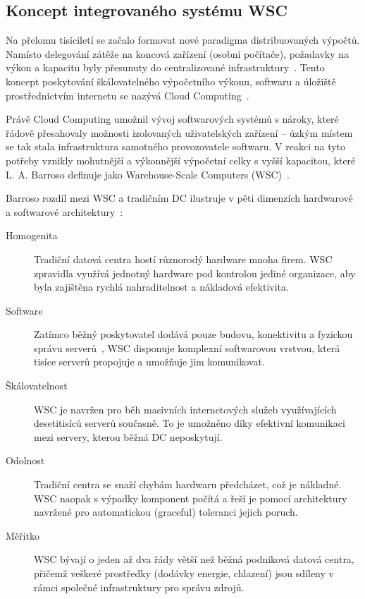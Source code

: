 \subsection{Koncept integrovaného systému WSC}
\label{subsec:wsc}

Na přelomu tisíciletí se začalo formovat nové paradigma distribuovaných výpočtů. Namísto delegování zátěže na koncová zařízení (osobní počítače), požadavky na výkon a kapacitu byly přesunuty do centralizované infrastruktury~\cite{barroso_data_2026}. Tento koncept poskytování škálovatelného výpočetního výkonu, softwaru a úložiště prostřednictvím internetu se nazývá Cloud Computing~\cite{lewis_basics_2010}.

Právě Cloud Computing umožnil vývoj softwarových systémů s nároky, které řádově přesahovaly možnosti izolovaných uživatelských zařízení -- úzkým místem se tak stala infrastruktura samotného provozovatele softwaru. V reakci na tyto potřeby vznikly mohutnější a výkonnější výpočetní celky s vyšší kapacitou, které L. A. Barroso definuje jako Warehouse-Scale Computers (WSC)~\cite{barroso_brief_2021, barroso_data_2026}.

Barroso rozdíl mezi WSC a tradičním DC ilustruje v pěti dimenzích hardwarové a softwarové architektury~\cite[s.~2--4]{barroso_data_2026}:

\begin{description}
    \item[Homogenita] Tradiční datová centra hostí různorodý hardware mnoha firem. WSC zpravidla využívá jednotný hardware pod kontrolou jediné organizace, aby byla zajištěna rychlá nahraditelnost a nákladová efektivita.
    
    \item[Software] Zatímco běžný poskytovatel dodává pouze budovu, konektivitu a fyzickou správu serverů~\cite[s.~10]{marx_gomez_foundations_2017}, WSC disponuje komplexní softwarovou vrstvou, která tisíce serverů propojuje a umožňuje jim komunikovat.
    
    \item[Škálovatelnost] WSC je navržen pro běh masivních internetových služeb využívajících desetitisíců serverů současně. To je umožněno díky efektivní komunikaci mezi servery, kterou běžná DC neposkytují.
    
    \item[Odolnost] Tradiční centra se snaží chybám hardwaru předcházet, což je nákladné. WSC naopak s výpadky komponent počítá a řeší je pomocí architektury navržené pro automatickou (graceful) toleranci jejich poruch.
    
    \item[Měřítko] WSC bývají o jeden až dva řády větší než běžná podniková datová centra, přičemž veškeré prostředky (dodávky energie, chlazení) jsou sdíleny v rámci společné infrastruktury pro správu zdrojů.
\end{description}

